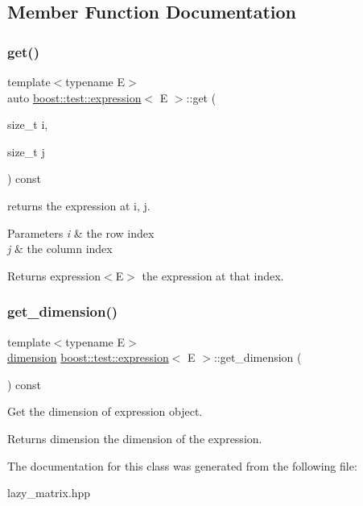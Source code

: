 \subsection{Member Function Documentation}
\mbox{\label{classboost_1_1test_1_1expression_a87b3b3d8e7b4f27ea12674769c4ee7f1}} 
\subsubsection{\texorpdfstring{get()}{get()}}
{\footnotesize\ttfamily template$<$typename E$>$ \\
auto \mbox{\hyperlink{classboost_1_1test_1_1expression}{boost\+::test\+::expression}}$<$ E $>$\+::get (\begin{DoxyParamCaption}\item[{size\+\_\+t}]{i,  }\item[{size\+\_\+t}]{j }\end{DoxyParamCaption}) const\hspace{0.3cm}{\ttfamily [inline]}}



returns the expression at i, j. 


\begin{DoxyParams}{Parameters}
{\em i} & the row index \\
\hline
{\em j} & the column index \\
\hline
\end{DoxyParams}
\begin{DoxyReturn}{Returns}
expression$<$\+E$>$ the expression at that index. 
\end{DoxyReturn}
\mbox{\label{classboost_1_1test_1_1expression_a7eeb067f2e8df1a1932fb7101e6cc3f1}} 
\subsubsection{\texorpdfstring{get\_dimension()}{get\_dimension()}}
{\footnotesize\ttfamily template$<$typename E$>$ \\
\mbox{\hyperlink{structboost_1_1test_1_1dimension}{dimension}} \mbox{\hyperlink{classboost_1_1test_1_1expression}{boost\+::test\+::expression}}$<$ E $>$\+::get\+\_\+dimension (\begin{DoxyParamCaption}{ }\end{DoxyParamCaption}) const\hspace{0.3cm}{\ttfamily [inline]}}



Get the dimension of expression object. 

\begin{DoxyReturn}{Returns}
dimension the dimension of the expression. 
\end{DoxyReturn}


The documentation for this class was generated from the following file\+:\begin{DoxyCompactItemize}
\item 
lazy\+\_\+matrix.\+hpp\end{DoxyCompactItemize}
